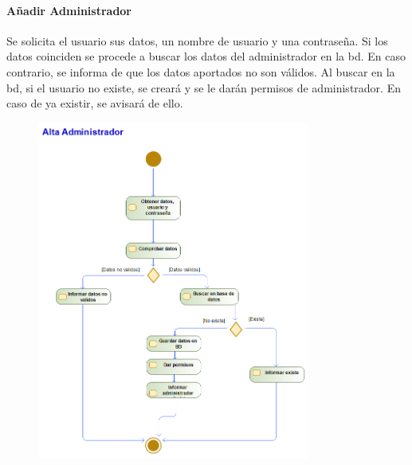 \paragraph{Añadir Administrador}
Se solicita el usuario sus datos, un nombre de usuario y una contraseña. Si los datos coinciden se procede a buscar los datos del administrador en la \gls{bd}. En caso contrario, se informa de que los datos aportados no son válidos. Al buscar en la \gls{bd}, si el usuario no existe, se creará y se le darán permisos de administrador. En caso de ya existir, se avisará de ello.
\begin{figure}[H]
    \centering
    \includegraphics[width=0.8\textwidth]{Use_Cases/alta_admin.png}
\end{figure}
